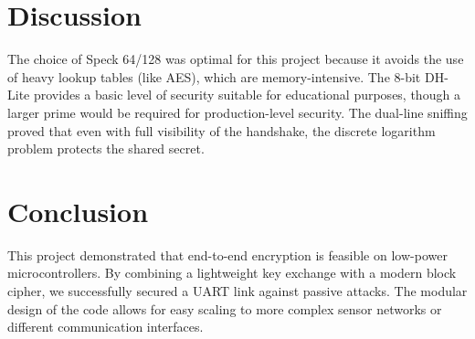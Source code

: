 \documentclass[12pt,a4paper]{article}
\begin{document}
\section{Discussion}
The choice of Speck 64/128 was optimal for this project because it avoids the use of heavy lookup tables (like AES), which are memory-intensive. The 8-bit DH-Lite provides a basic level of security suitable for educational purposes, though a larger prime would be required for production-level security. The dual-line sniffing proved that even with full visibility of the handshake, the discrete logarithm problem protects the shared secret.

\section{Conclusion}
This project demonstrated that end-to-end encryption is feasible on low-power microcontrollers. By combining a lightweight key exchange with a modern block cipher, we successfully secured a UART link against passive attacks. The modular design of the code allows for easy scaling to more complex sensor networks or different communication interfaces.
\end{document}

